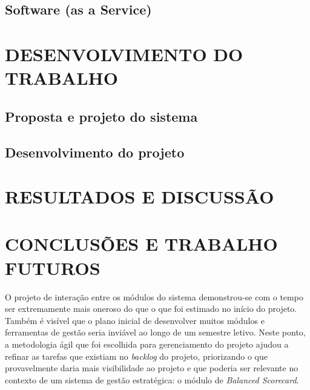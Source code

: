 \documentclass{abnt}
\begin{document}

\section{Software (as a Service)}


\chapter{DESENVOLVIMENTO DO TRABALHO}

\section{Proposta e projeto do sistema}


\section{Desenvolvimento do projeto}


\chapter{RESULTADOS E DISCUSSÃO}


\chapter{CONCLUSÕES E TRABALHO FUTUROS}

O projeto de interação entre os módulos do sistema demonstrou-se com o tempo ser
extremamente mais oneroso do que o que foi estimado no início do projeto. Também
é visível que o plano inicial de desenvolver muitos módulos e ferramentas de
gestão seria inviável ao longo de um semestre letivo. Neste ponto, a metodologia
ágil que foi escolhida para gerenciamento do projeto ajudou a refinar as tarefas
que existiam no \textit{backlog} do projeto, priorizando o que provavelmente
daria mais visibilidade ao projeto e que poderia ser relevante no contexto de um
sistema de gestão estratégica: o módulo de \textit{Balanced Scorecard}.
\end{document}
